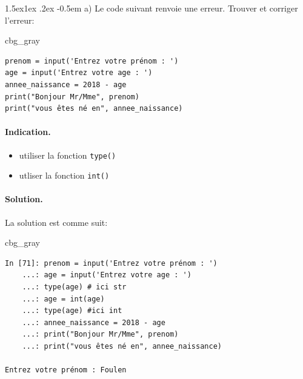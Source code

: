 \documentclass[%
oneside,                 %
final,                   %
10pt,french]{article}
\makeatletter
\newenvironment{_cod_tight}[1]{
   \def\FrameCommand{\colorbox{#1}}
   \FrameRule0.6pt\MakeFramed {\FrameRestore}\vskip3mm}
   {\vskip0mm\endMakeFramed}
\newenvironment{cod}[1]{
\bgroup\rmfamily
\fboxsep=0mm\relax
\begin{_cod_tight}{#1}
\list{}{\parsep=-2mm\parskip=0mm\topsep=0pt\leftmargin=2mm
\rightmargin=2\leftmargin\leftmargin=4pt\relax}
\item\relax}
{\endlist\end{_cod_tight}\egroup}
\newenvironment{doconceexercise}{}{}
\newcounter{doconceexercisecounter}
\newcommand\subex{\@startsection{paragraph}{4}{\z@}%
                  {1.5ex\@plus1ex \@minus.2ex}%
                  {-0.5em}%
                  {\normalfont\normalsize\bfseries}}
\makeatother
\begin{document}
\begin{doconceexercise}




\subex{a)}
Le code suivant renvoie une erreur. Trouver et corriger l'erreur:

\begin{cod}{cbg_gray}\begin{verbatim}
prenom = input('Entrez votre prénom : ')
age = input('Entrez votre age : ')
annee_naissance = 2018 - age
print("Bonjour Mr/Mme", prenom)
print("vous êtes né en", annee_naissance)
\end{verbatim}
\end{cod}
\noindent


\paragraph{Indication.}
\begin{itemize}
\item utiliser la fonction \texttt{type()}

\item utliser la fonction \texttt{int()}
\end{itemize}

\noindent


\paragraph{Solution.}
La solution est comme suit:

\begin{cod}{cbg_gray}\begin{verbatim}
In [71]: prenom = input('Entrez votre prénom : ')
    ...: age = input('Entrez votre age : ')
    ...: type(age) # ici str
    ...: age = int(age)
    ...: type(age) #ici int
    ...: annee_naissance = 2018 - age
    ...: print("Bonjour Mr/Mme", prenom)
    ...: print("vous êtes né en", annee_naissance)

Entrez votre prénom : Foulen


\end{verbatim}
\end{cod}
\end{doconceexercise}
\end{document}
